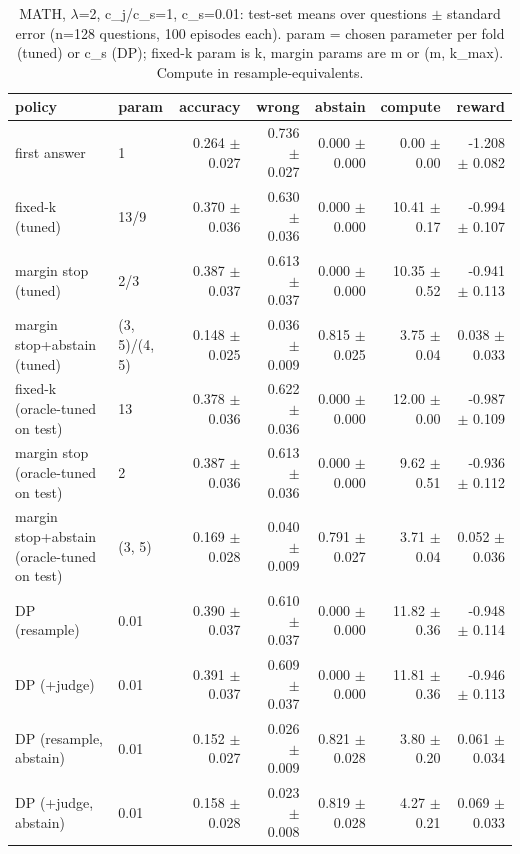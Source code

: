 \begin{table}[t]
\centering
\small
\caption{MATH, $\lambda$=2, c\_j/c\_s=1, c\_s=0.01: test-set means over questions $\pm$ standard error (n=128 questions, 100 episodes each). param = chosen parameter per fold (tuned) or c\_s (DP); fixed-k param is k, margin params are m or (m, k\_max). Compute in resample-equivalents.}
\label{tab:headline_math_lam2_jr1}
\begin{tabular}{llrrrrr}
\toprule
policy & param & accuracy & wrong & abstain & compute & reward \\
\midrule
first answer & 1 & 0.264 $\pm$ 0.027 & 0.736 $\pm$ 0.027 & 0.000 $\pm$ 0.000 & 0.00 $\pm$ 0.00 & -1.208 $\pm$ 0.082 \\
fixed-k (tuned) & 13/9 & 0.370 $\pm$ 0.036 & 0.630 $\pm$ 0.036 & 0.000 $\pm$ 0.000 & 10.41 $\pm$ 0.17 & -0.994 $\pm$ 0.107 \\
margin stop (tuned) & 2/3 & 0.387 $\pm$ 0.037 & 0.613 $\pm$ 0.037 & 0.000 $\pm$ 0.000 & 10.35 $\pm$ 0.52 & -0.941 $\pm$ 0.113 \\
margin stop+abstain (tuned) & (3, 5)/(4, 5) & 0.148 $\pm$ 0.025 & 0.036 $\pm$ 0.009 & 0.815 $\pm$ 0.025 & 3.75 $\pm$ 0.04 & 0.038 $\pm$ 0.033 \\
fixed-k (oracle-tuned on test) & 13 & 0.378 $\pm$ 0.036 & 0.622 $\pm$ 0.036 & 0.000 $\pm$ 0.000 & 12.00 $\pm$ 0.00 & -0.987 $\pm$ 0.109 \\
margin stop (oracle-tuned on test) & 2 & 0.387 $\pm$ 0.036 & 0.613 $\pm$ 0.036 & 0.000 $\pm$ 0.000 & 9.62 $\pm$ 0.51 & -0.936 $\pm$ 0.112 \\
margin stop+abstain (oracle-tuned on test) & (3, 5) & 0.169 $\pm$ 0.028 & 0.040 $\pm$ 0.009 & 0.791 $\pm$ 0.027 & 3.71 $\pm$ 0.04 & 0.052 $\pm$ 0.036 \\
DP (resample) & 0.01 & 0.390 $\pm$ 0.037 & 0.610 $\pm$ 0.037 & 0.000 $\pm$ 0.000 & 11.82 $\pm$ 0.36 & -0.948 $\pm$ 0.114 \\
DP (+judge) & 0.01 & 0.391 $\pm$ 0.037 & 0.609 $\pm$ 0.037 & 0.000 $\pm$ 0.000 & 11.81 $\pm$ 0.36 & -0.946 $\pm$ 0.113 \\
DP (resample, abstain) & 0.01 & 0.152 $\pm$ 0.027 & 0.026 $\pm$ 0.009 & 0.821 $\pm$ 0.028 & 3.80 $\pm$ 0.20 & 0.061 $\pm$ 0.034 \\
DP (+judge, abstain) & 0.01 & 0.158 $\pm$ 0.028 & 0.023 $\pm$ 0.008 & 0.819 $\pm$ 0.028 & 4.27 $\pm$ 0.21 & 0.069 $\pm$ 0.033 \\
\bottomrule
\end{tabular}
\end{table}

